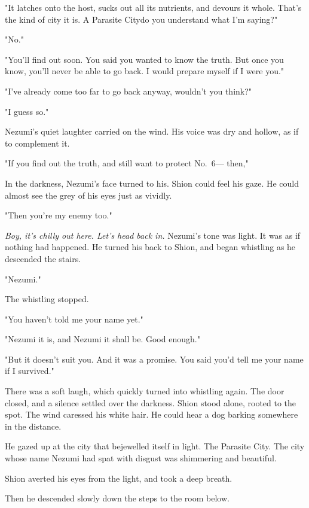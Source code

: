 "It latches onto the host, sucks out all its nutrients, and devours it
whole. That's the kind of city it is. A Parasite City\el do you
understand what I'm saying?"

"No."

"You'll find out soon. You said you wanted to know the truth. But once
you know, you'll never be able to go back. I would prepare myself if I
were you."

"I've already come too far to go back anyway, wouldn't you think?"

"I guess so."

Nezumi's quiet laughter carried on the wind. His voice was dry and
hollow, as if to complement it.

"If you find out the truth, and still want to protect No.~6--- then,"

In the darkness, Nezumi's face turned to his. Shion could feel his gaze.
He could almost see the grey of his eyes just as vividly.

"Then you're my enemy too."

\emph{Boy, it's chilly out here. Let's head back in.} Nezumi's tone was light.
It was as if nothing had happened. He turned his back to Shion, and
began whistling as he descended the stairs.

"Nezumi."

The whistling stopped.

"You haven't told me your name yet."

"Nezumi it is, and Nezumi it shall be. Good enough."

"But it doesn't suit you. And it was a promise. You said you'd tell me
your name if I survived."

There was a soft laugh, which quickly turned into whistling again. The
door closed, and a silence settled over the darkness. Shion stood alone,
rooted to the spot. The wind caressed his white hair. He could hear a
dog barking somewhere in the distance.

He gazed up at the city that bejewelled itself in light. The Parasite
City. The city whose name Nezumi had spat with disgust was shimmering
and beautiful.

Shion averted his eyes from the light, and took a deep breath.

Then he descended slowly down the steps to the room below.